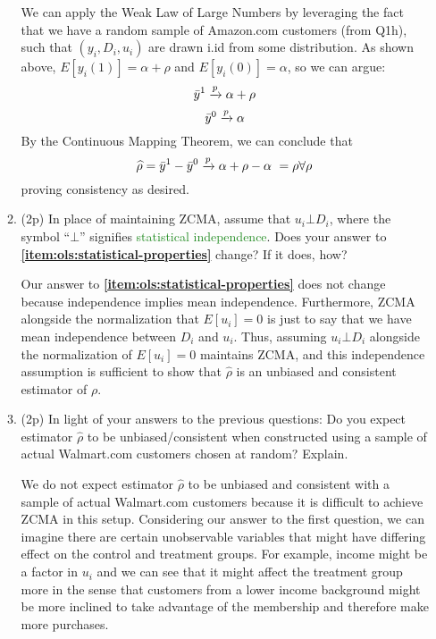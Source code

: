 \documentclass{article}
\begin{document}
\begin{enumerate}[label=\textbf{Q\arabic{enumi}}.,ref=Q\arabic{enumi}, wide=0pt, itemsep=1em, topsep=5pt]
\begin{enumerate}
\begin{solution}
{            We can apply the Weak Law of Large Numbers by leveraging the fact that we have a random sample of Amazon.com customers (from Q1h), such that  $(y_i, D_i, u_i)$ are drawn i.id from some distribution.
            As shown above, $E[y_i(1)] = \alpha + \rho$ and $E[y_i(0)] = \alpha$, so we can argue:
                \[\Bar{y}^1 \xrightarrow{p} \alpha + \rho\]
                \[\Bar{y}^0 \xrightarrow{p} \alpha\]
            By the Continuous Mapping Theorem, we can conclude that
            \[\widehat{\rho} = \Bar{y}^1 - \Bar{y}^0 \xrightarrow{p} \alpha + \rho -\alpha\ = \rho \forall \rho\]
            proving consistency as desired.
        }
        \end{solution}
        \newpage
        \item (2p) In place of maintaining ZCMA, assume that $u _{i}\bot D_{i}$, where the symbol ``$\bot $'' signifies \textcolor{ForestGreen}{statistical independence}. Does your answer to \textbf{\ref{item:ols:statistical-properties}} change? If it does, how?

        \begin{solution}
            {
                Our answer to \textbf{\ref{item:ols:statistical-properties}} does not change because independence implies mean independence. Furthermore, ZCMA alongside the normalization that $E[u_i] = 0$ is just to say that we have mean independence between $D_i$ and $u_i$. Thus, assuming $u _{i}\bot D_{i}$ alongside the normalization of $E[u_i] = 0$ maintains ZCMA, and this independence assumption is sufficient to show that $\widehat{\rho}$ is an unbiased and consistent estimator of $\rho$.
            }
        \end{solution}

        \item (2p) In light of your answers to the previous questions: Do you expect estimator $\widehat{\rho }$ to be unbiased/consistent when constructed using a sample of actual Walmart.com customers chosen at random? Explain.

        \begin{solution}
            {
                We do not expect estimator $\widehat{\rho }$ to be unbiased and consistent with a sample of actual Walmart.com customers because it is difficult to achieve ZCMA in this setup. Considering our answer to the first question, we can imagine there are certain unobservable variables that might have differing effect on the control and treatment groups. For example, income might be a factor in $u_i$ and we can see that it might affect the treatment group more in the sense that customers from a lower income background might be more inclined to take advantage of the membership and therefore make more purchases.
            }
        \end{solution}
        \end{enumerate}


\end{enumerate}
\end{document}
